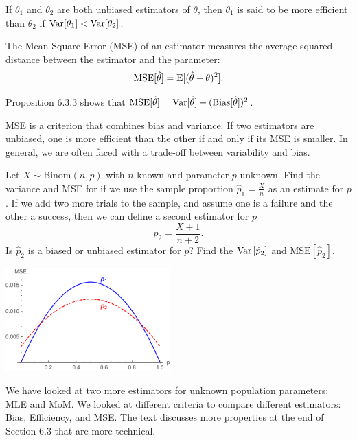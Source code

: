\ms
\ee

  
  \bbox
    If $\theta_1$ and $\theta_2$ are both unbiased estimators of $\theta$, then  $\theta_1$ is said to be
    more \alert{efficient} than $\theta_2$ if $\mbox{Var} \lbrack \theta_1 \rbrack < \mbox{Var} \lbrack \theta_2 \rbrack$.
  \ebox


 \bbox
   The \alert{Mean Square Error (MSE)} of an estimator measures the average squared distance between the estimator and the parameter:
 \[ \mbox{MSE} \lbrack \hat{\theta} \rbrack = \mbox{E} \lbrack (\hat{\theta}-\theta)^2 \rbrack.\]


 \alert{Proposition 6.3.3} shows that  $\mbox{MSE} \lbrack \hat{\theta} \rbrack = \mbox{Var}  \lbrack \hat{\theta} \rbrack + (\mbox{Bias} \lbrack \hat{\theta} \rbrack)^2$.
\ebox

 \bi
 \ii MSE is  a criterion that  combines bias and variance.
\ii If two estimators are unbiased, one is more efficient than the other if and only if its MSE is smaller.
\ii In general, we are often faced with a trade-off between variability and bias.
\ei


\clearpage


 \bb[resume]
\ii Let $X \sim \mbox{Binom}(n,p)$ with $n$ known and parameter $p$ unknown.
  \bb
  \ii Find the variance and MSE for if we use the sample proportion $\hat{p}_1 = \frac{X}{n}$ as an estimate for $p$. \vfill
  \ii If we add two more trials to the sample, and assume one is a failure and the other a success, then we can define a second estimator for $p$
  \[ \hat{p}_2 = \frac{X+1}{n+2}. \] \vfill
  \ii Is $\hat{p}_2$ is a biased or unbiased estimator for $p$? \vfill
   \ii Find the $\mbox{Var} \left[ \hat{p}_2 \right]$ and $\mbox{MSE} \left[ \hat{p}_2 \right]$. \vspace{2.5in}
   \ee
\ee

\hspace{4in}    \includegraphics[width=2.5in]{15/chap6-mse.png}


\bbox
    \bi
    \ii We have looked at two more estimators for unknown population parameters: MLE and MoM.
    \ii We looked at different criteria to compare different estimators: Bias, Efficiency, and MSE.
    \ii The text discusses more properties at the end of Section 6.3 that are more technical.
    \ei
  \ebox  




 
